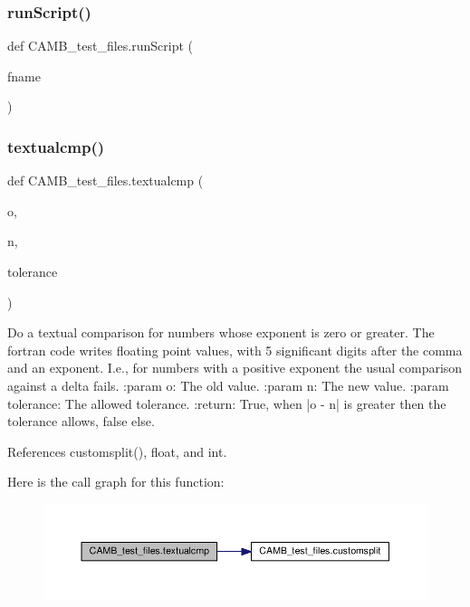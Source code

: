\subsubsection{\texorpdfstring{run\+Script()}{runScript()}}
{\footnotesize\ttfamily def C\+A\+M\+B\+\_\+test\+\_\+files.\+run\+Script (\begin{DoxyParamCaption}\item[{}]{fname }\end{DoxyParamCaption})}

\mbox{\label{namespaceCAMB__test__files_ab9daec082b15ebd0f1fdbef965cb2c82}} 
\subsubsection{\texorpdfstring{textualcmp()}{textualcmp()}}
{\footnotesize\ttfamily def C\+A\+M\+B\+\_\+test\+\_\+files.\+textualcmp (\begin{DoxyParamCaption}\item[{}]{o,  }\item[{}]{n,  }\item[{}]{tolerance }\end{DoxyParamCaption})}

\begin{DoxyVerb}Do a textual comparison for numbers whose exponent is zero or greater.
The fortran code writes floating point values, with 5 significant digits
after the comma and an exponent. I.e., for numbers with a positive
exponent the usual comparison against a delta fails.
:param o: The old value.
:param n: The new value.
:param tolerance: The allowed tolerance.
:return: True, when |o - n| is greater then the tolerance allows, false else.
\end{DoxyVerb}
 

References customsplit(), float, and int.

Here is the call graph for this function\+:
\nopagebreak
\begin{figure}[H]
\begin{center}
\leavevmode
\includegraphics[width=350pt]{namespaceCAMB__test__files_ab9daec082b15ebd0f1fdbef965cb2c82_cgraph}
\end{center}
\end{figure}
\mbox{\label{namespaceCAMB__test__files_ab28edef047b56aa699abc0b3212cd5fa}} 
